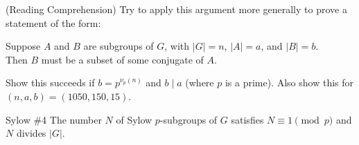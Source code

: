 \begin{remark}
    (Reading Comprehension) Try to apply this argument more generally to prove a statement of the form:
    \begin{center}
        Suppose $A$ and $B$ are subgroups of $G$, with $|G| = n$, $|A| = a$, and $|B| = b$. \\ Then $B$ must be a subset of some conjugate of $A$.
    \end{center}
    Show this succeeds if $b = p^{\nu_p(n)}$ and $b \mid a$ (where $p$ is a prime).  Also show this for $(n, a, b) = (1050, 150, 15)$.
\end{remark}

\begin{theorem}{Sylow \#4}
    The number $N$ of Sylow $p$-subgroups of $G$ satisfies $N \equiv 1 \pmod{p}$ and $N$ divides $|G|$.
\end{theorem}

